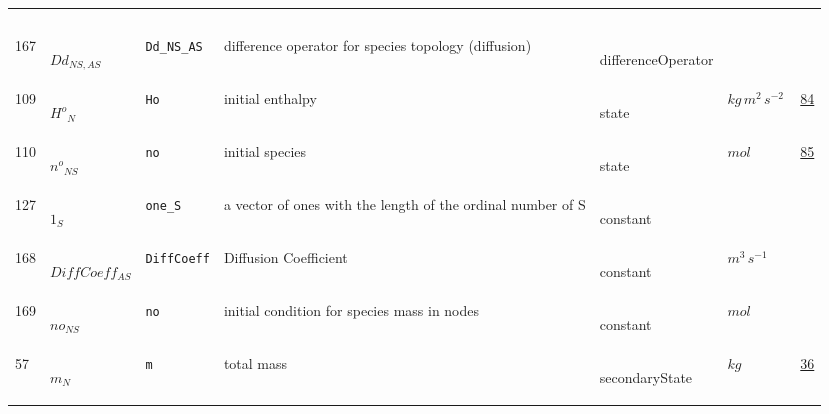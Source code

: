\begin{longtable}{|p{1cm}|p{2.5cm}|p{4.5cm}|p{8cm}|p{3.0cm}|p{3cm}|p{1cm}|}
             & $  $
             & \\
    167
             & \hypertarget{"v:167"}{ $ {Dd}{_{{N S}, {A S}}} $}
             & \verb|Dd_NS_AS|
             & difference operator for species topology (diffusion)
             & \begin{lay}differenceOperator \end{lay}
             & $  $
             & \\
    109
             & \hypertarget{"v:109"}{ $ {{H^o}}{_{N}} $}
             & \verb|Ho|
             & initial enthalpy
             & \begin{lay}state \end{lay}
             & $ kg \,m^{2} \,s^{-2} \, $
             & \hyperlink{"e:84"}{ 84 }
                 \\
    110
             & \hypertarget{"v:110"}{ $ {{n^o}}{_{{N S}}} $}
             & \verb|no|
             & initial species
             & \begin{lay}state \end{lay}
             & $ mol \, $
             & \hyperlink{"e:85"}{ 85 }
                 \\
    127
             & \hypertarget{"v:127"}{ $ {{1}}{_{S}} $}
             & \verb|one_S|
             & a vector of ones with the length of the ordinal number of S
             & \begin{lay}constant \end{lay}
             & $  $
             & \\
    168
             & \hypertarget{"v:168"}{ $ {DiffCoeff}{_{{A S}}} $}
             & \verb|DiffCoeff|
             & Diffusion Coefficient
             & \begin{lay}constant \end{lay}
             & $ m^{3} \,s^{-1} \, $
             & \\
    169
             & \hypertarget{"v:169"}{ $ {no}{_{{N S}}} $}
             & \verb|no|
             & initial condition for species mass in nodes
             & \begin{lay}constant \end{lay}
             & $ mol \, $
             & \\
    57
             & \hypertarget{"v:57"}{ $ {m}{_{N}} $}
             & \verb|m|
             & total mass
             & \begin{lay}secondaryState \end{lay}
             & $ kg \, $
             & \hyperlink{"e:36"}{ 36 }

\end{longtable}
